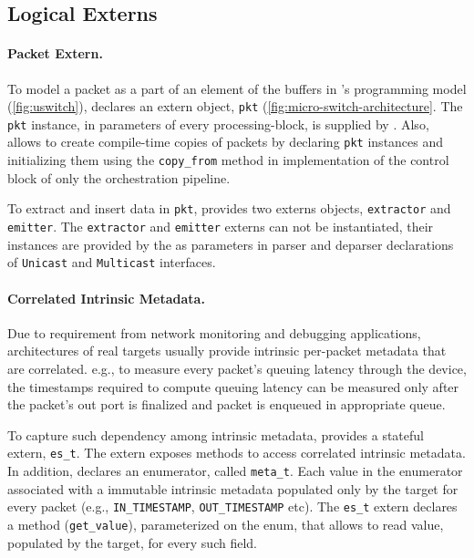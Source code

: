 \documentclass[letterpaper,twocolumn,10pt]{article}
\begin{document}
\subsection{Logical Externs}
\label{sec:logical-externs}

\paragraph{Packet Extern.}
To model a packet as a part of an element of the buffers in 
\uswitch's programming model (\cref{fig:uswitch}), \uarch declares an 
extern object, \texttt{pkt} (\cref{fig:micro-switch-architecture}.
The \texttt{pkt} instance, in parameters of every processing-block, 
is  supplied by \uswitch. Also, \uswitch allows to create 
compile-time copies of packets by declaring \texttt{pkt} instances 
and initializing them using the \texttt{copy\_from} method in 
implementation of the control block of only the orchestration 
pipeline.

To extract and insert data in \texttt{pkt}, \uarch provides two 
externs objects, \texttt{extractor} and \texttt{emitter}.
The \texttt{extractor} and \texttt{emitter} externs can not be 
instantiated, their instances are provided by the \uswitch as 
parameters in parser and deparser declarations of \texttt{Unicast} 
and \texttt{Multicast} interfaces. 

\paragraph{Correlated Intrinsic Metadata.}
Due to requirement from network monitoring and debugging applications,
architectures of real targets usually provide intrinsic per-packet 
metadata that are correlated. e.g., to measure every packet's queuing 
latency through the device, the timestamps required to compute 
queuing latency can be measured only after the packet's out port is 
finalized and packet is enqueued in appropriate queue.

To capture such dependency among intrinsic metadata, \uarch provides 
a stateful extern, \texttt{es\_t}. The extern exposes methods to 
access correlated intrinsic metadata. In addition, \uarch declares an 
enumerator, called \texttt{meta\_t}. Each value in the enumerator 
associated with a immutable intrinsic metadata populated only by the 
target for every packet (e.g., \texttt{IN\_TIMESTAMP}, 
\texttt{OUT\_TIMESTAMP} etc). The \texttt{es\_t} extern declares a 
method (\texttt{get\_value}), parameterized on the enum, that allows 
to read value, populated by the target, for every such field.
\end{document}
